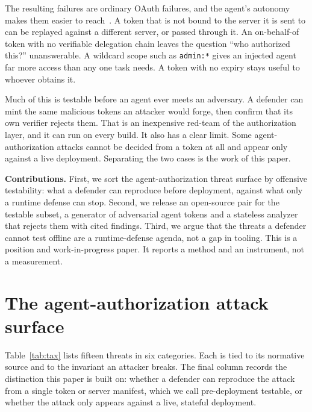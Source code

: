 The resulting failures are ordinary OAuth failures, and the agent's autonomy makes
them easier to reach~\cite{rfc9700,mcpauth}. A token that is not bound to the server
it is sent to can be replayed against a different server, or passed through it. An
on-behalf-of token with no verifiable delegation chain leaves the question ``who
authorized this?'' unanswerable. A wildcard scope such as \texttt{admin:*} gives an
injected agent far more access than any one task needs. A token with no expiry stays
useful to whoever obtains it.

Much of this is testable before an agent ever meets an adversary. A defender can mint
the same malicious tokens an attacker would forge, then confirm that its own verifier
rejects them. That is an inexpensive red-team of the authorization layer, and it can
run on every build. It also has a clear limit. Some agent-authorization attacks
cannot be decided from a token at all and appear only against a live deployment.
Separating the two cases is the work of this paper.

\noindent\textbf{Contributions.} First, we sort the agent-authorization threat
surface by offensive testability: what a defender can reproduce before deployment,
against what only a runtime defense can stop. Second, we release an open-source pair
for the testable subset, a generator of adversarial agent tokens and a stateless
analyzer that rejects them with cited findings. Third, we argue that the threats a
defender cannot test offline are a runtime-defense agenda, not a gap in tooling. This
is a position and work-in-progress paper. It reports a method and an instrument, not
a measurement.

\section{The agent-authorization attack surface}\label{sec:surface}
Table~\ref{tab:tax} lists fifteen threats in six categories. Each is tied to its
normative source and to the invariant an attacker breaks. The final column records
the distinction this paper is built on: whether a defender can reproduce the attack
from a single token or server manifest, which we call pre-deployment testable, or
whether the attack only appears against a live, stateful deployment.

